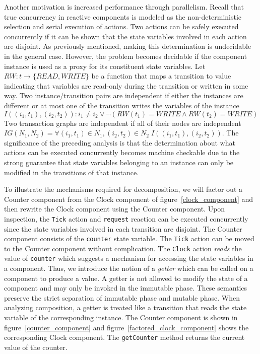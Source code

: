 Another motivation is increased performance through parallelism.
Recall that true concurrency in reactive components is modeled as the non-deterministic selection and serial execution of actions.
Two actions can be safely executed concurrently if it can be shown that the state variables involved in each action are disjoint.
As previously mentioned, making this determination is undecidable in the general case.
However, the problem becomes decidable if the component instance is used as a proxy for its constituent state variables.
Let $RW: t \to \{ READ, WRITE \}$ be a function that maps a transition to value indicating that variables are read-only during the transition or written in some way.
Two instance/transition pairs are independent if either the instances are different or at most one of the transition writes the variables of the instance
\begin{displaymath}
I((i_1, t_1), (i_2, t_2)): i_1 \ne i_2 \lor \lnot (RW(t_1) = WRITE \land RW(t_2) = WRITE)
\end{displaymath}
Two transaction graphs are independent if all of their nodes are independent $IG(N_1, N_2) = \forall (i_1, t_1) \in N_1, (i_2, t_2) \in N_2 \; I((i_1, t_1), (i_2, t_2))$.
The significance of the preceding analysis is that the determination about what actions can be executed concurrently becomes machine checkable due to the strong guarantee that state variables belonging to an instance can only be modified in the transitions of that instance.

To illustrate the mechanisms required for decomposition, we will factor out a Counter component from the Clock component of figure~\ref{clock_component} and then rewrite the Clock component using the Counter component.
Upon inspection, the \verb+Tick+ action and \verb+request+ reaction can be executed concurrently since the state variables involved in each transition are disjoint.
The Counter component consists of the \verb+counter+ state variable.
The \verb+Tick+ action can be moved to the Counter component without complication.
The \verb+Clock+ action \emph{reads} the value of \verb+counter+ which suggests a mechanism for accessing the state variables in a component.
Thus, we introduce the notion of a \emph{getter} which can be called on a component to produce a value.
A getter is not allowed to modify the state of a component and may only be invoked in the immutable phase.
These semantics preserve the strict separation of immutable phase and mutable phase.
When analyzing composition, a getter is treated like a transition that reads the state variable of the corresponding instance.
The Counter component is shown in figure~\ref{counter_component} and figure~\ref{factored_clock_component} shows the corresponding Clock component.
The \verb+getCounter+ method returns the current value of the counter.

